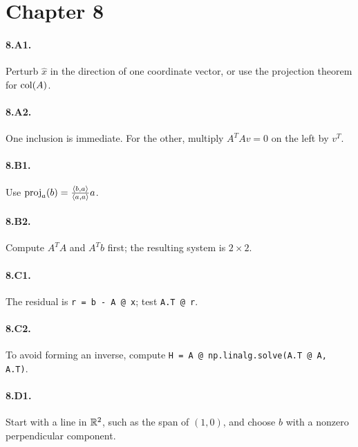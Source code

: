 \section*{Chapter 8}
\paragraph{8.A1.} Perturb $\hat{x}$ in the direction of one coordinate vector,
or use the projection theorem for $\operatorname{col}(A)$.
\paragraph{8.A2.} One inclusion is immediate. For the other, multiply
$A^TAv=0$ on the left by $v^T$.
\paragraph{8.B1.} Use $\operatorname{proj}_a(b)=\frac{\left\langle b,a \right\rangle}{\left\langle a,a \right\rangle}a$.
\paragraph{8.B2.} Compute $A^TA$ and $A^Tb$ first; the resulting system is
$2\times 2$.
\paragraph{8.C1.} The residual is \texttt{r = b - A @ x}; test
\texttt{A.T @ r}.
\paragraph{8.C2.} To avoid forming an inverse, compute
\texttt{H = A @ np.linalg.solve(A.T @ A, A.T)}.
\paragraph{8.D1.} Start with a line in $\mathbb{R}^2$, such as the span of
$(1,0)$, and choose $b$ with a nonzero perpendicular component.

